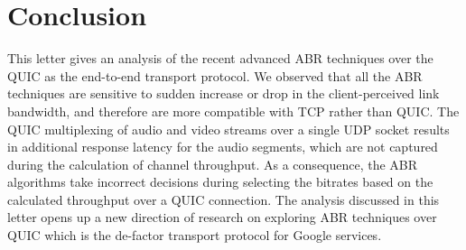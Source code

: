 \section{Conclusion}
This letter gives an analysis of the recent advanced ABR techniques over the QUIC as the end-to-end transport protocol. We observed that all the ABR techniques are sensitive to sudden increase or drop in the client-perceived link bandwidth, and therefore are more compatible with TCP rather than QUIC. The QUIC multiplexing of audio and video streams over a single UDP socket results in additional response latency for the audio segments, which are not captured during the calculation of channel throughput. As a consequence, the ABR algorithms take incorrect decisions during selecting the bitrates based on the calculated throughput over a QUIC connection. The analysis discussed in this letter opens up a new direction of research on exploring ABR techniques over QUIC which is the de-factor transport protocol for Google services. 